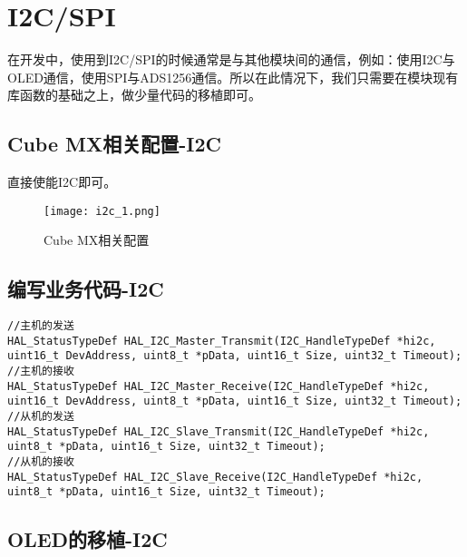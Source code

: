 \documentclass[cn,11pt]{elegantbook}
\begin{document}
\section{I2C/SPI}
在开发中，使用到I2C/SPI的时候通常是与其他模块间的通信，例如：使用I2C与OLED通信，使用SPI与ADS1256通信。所以在此情况下，我们只需要在模块现有库函数的基础之上，做少量代码的移植即可。

\subsection{Cube MX相关配置-I2C}

直接使能I2C即可。
\begin{figure}[htbp]
	\centering
	\texttt{[image: i2c\_1.png]}
	\caption{Cube MX相关配置 \label{fig:scatter}}
\end{figure}

\newpage

\subsection{编写业务代码-I2C}

\lstset{language=C}
\begin{lstlisting}
//主机的发送
HAL_StatusTypeDef HAL_I2C_Master_Transmit(I2C_HandleTypeDef *hi2c, uint16_t DevAddress, uint8_t *pData, uint16_t Size, uint32_t Timeout);
//主机的接收
HAL_StatusTypeDef HAL_I2C_Master_Receive(I2C_HandleTypeDef *hi2c, uint16_t DevAddress, uint8_t *pData, uint16_t Size, uint32_t Timeout);
//从机的发送
HAL_StatusTypeDef HAL_I2C_Slave_Transmit(I2C_HandleTypeDef *hi2c, uint8_t *pData, uint16_t Size, uint32_t Timeout);
//从机的接收
HAL_StatusTypeDef HAL_I2C_Slave_Receive(I2C_HandleTypeDef *hi2c, uint8_t *pData, uint16_t Size, uint32_t Timeout);
\end{lstlisting}

\subsection{OLED的移植-I2C}
\end{document}
